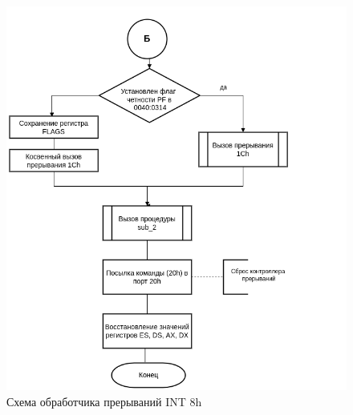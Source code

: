 \begin{figure}[h!]
	\begin{center}
		\includegraphics[scale=0.7]{img/int8h_3}
	\end{center}
	\captionsetup{justification=centering}
	\caption{Схема обработчика прерываний INT 8h}
	\label{img:s1}
\end{figure}



